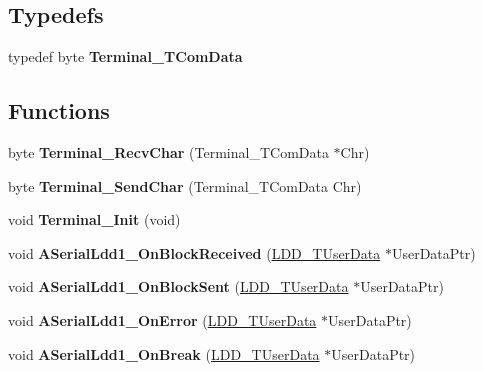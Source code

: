 \subsection*{Typedefs}
\begin{DoxyCompactItemize}
\item 
\mbox{\label{group___terminal__module_ga352d51d0af211fb1f922a7885c7291b8}} 
typedef byte {\bfseries Terminal\+\_\+\+T\+Com\+Data}
\end{DoxyCompactItemize}
\subsection*{Functions}
\begin{DoxyCompactItemize}
\item 
\mbox{\label{group___terminal__module_ga094b635fa790e8663ccf5a4710ee3a01}} 
byte {\bfseries Terminal\+\_\+\+Recv\+Char} (Terminal\+\_\+\+T\+Com\+Data $\ast$Chr)
\item 
\mbox{\label{group___terminal__module_gaf8926d0826c5e595b422ebeb19fb7559}} 
byte {\bfseries Terminal\+\_\+\+Send\+Char} (Terminal\+\_\+\+T\+Com\+Data Chr)
\item 
\mbox{\label{group___terminal__module_gacc9b80fa13f248f795d961b1817b7d4b}} 
void {\bfseries Terminal\+\_\+\+Init} (void)
\item 
\mbox{\label{group___terminal__module_ga617597f21766b4f72d7f2883c21e6dd8}} 
void {\bfseries A\+Serial\+Ldd1\+\_\+\+On\+Block\+Received} (\hyperlink{group___p_e___types__module_ga0b66a73f87238a782318aa0be7578e35}{L\+D\+D\+\_\+\+T\+User\+Data} $\ast$User\+Data\+Ptr)
\item 
\mbox{\label{group___terminal__module_ga5b8a51aef1d1fede97ee58e31c945b78}} 
void {\bfseries A\+Serial\+Ldd1\+\_\+\+On\+Block\+Sent} (\hyperlink{group___p_e___types__module_ga0b66a73f87238a782318aa0be7578e35}{L\+D\+D\+\_\+\+T\+User\+Data} $\ast$User\+Data\+Ptr)
\item 
\mbox{\label{group___terminal__module_gab11d6ff796e37ab8d6c35dd8cc258f9a}} 
void {\bfseries A\+Serial\+Ldd1\+\_\+\+On\+Error} (\hyperlink{group___p_e___types__module_ga0b66a73f87238a782318aa0be7578e35}{L\+D\+D\+\_\+\+T\+User\+Data} $\ast$User\+Data\+Ptr)
\item 
\mbox{\label{group___terminal__module_gaff0fe796ad334f68b2a86273f5ade786}} 
void {\bfseries A\+Serial\+Ldd1\+\_\+\+On\+Break} (\hyperlink{group___p_e___types__module_ga0b66a73f87238a782318aa0be7578e35}{L\+D\+D\+\_\+\+T\+User\+Data} $\ast$User\+Data\+Ptr)
\end{DoxyCompactItemize}
